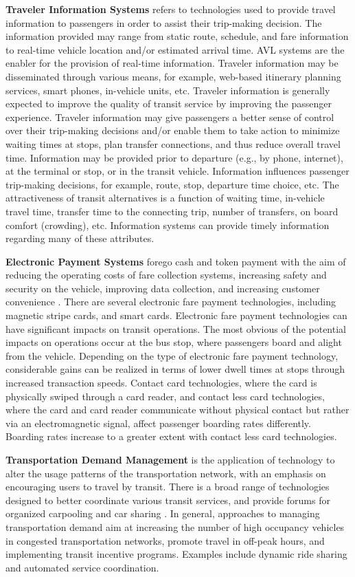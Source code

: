 \textbf{Traveler Information Systems} refers to technologies used to provide travel information to passengers in order to assist their trip-making decision. The information provided may range from static route, schedule, and fare information to real-time vehicle location and/or estimated arrival time. AVL systems are the enabler for the provision of real-time information. Traveler information may be disseminated through various means, for example, web-based itinerary planning services, smart phones, in-vehicle units, etc. Traveler information is generally expected to improve the quality of transit service by improving the passenger experience. Traveler information may give passengers a better sense of control over their trip-making decisions and/or enable them to take action to minimize waiting times at stops, plan transfer connections, and thus reduce overall travel time. Information may be provided prior to departure (e.g., by phone, internet), at the terminal or stop, or in the transit vehicle. Information influences passenger trip-making decisions, for example, route, stop, departure time choice, etc. The attractiveness of transit alternatives is a function of waiting time, in-vehicle travel time, transfer time to the connecting trip, number of transfers, on board comfort (crowding), etc. Information systems can provide timely information regarding many of these attributes.

\textbf{Electronic Payment Systems} forego cash and token payment with the aim of reducing the operating costs of fare collection systems, increasing safety and security on the vehicle, improving data collection, and increasing customer convenience . There are several electronic fare payment technologies, including magnetic stripe cards, and smart cards. Electronic fare payment technologies can have significant impacts on transit operations. The most obvious of the potential impacts on operations occur at the bus stop, where passengers board and alight from the vehicle. Depending on the type of electronic fare payment technology, considerable gains can be realized in terms of lower dwell times at stops through increased transaction speeds. Contact card technologies, where the card is physically swiped through a card reader, and contact less card technologies, where the card and card reader communicate without physical contact but rather via an electromagnetic signal, affect passenger boarding rates differently. Boarding rates increase to a greater extent with contact less card technologies.

\textbf{Transportation Demand Management} is the application of technology to alter the usage patterns of the transportation network, with an emphasis on encouraging users to travel by transit. There is a broad range of technologies designed to better coordinate various transit services, and provide forums for organized carpooling and car sharing . In general, approaches to managing transportation demand aim at increasing the number of high occupancy vehicles in congested transportation networks, promote travel in off-peak hours, and implementing transit incentive programs. Examples include dynamic ride sharing and automated service coordination.\cite{web004}



